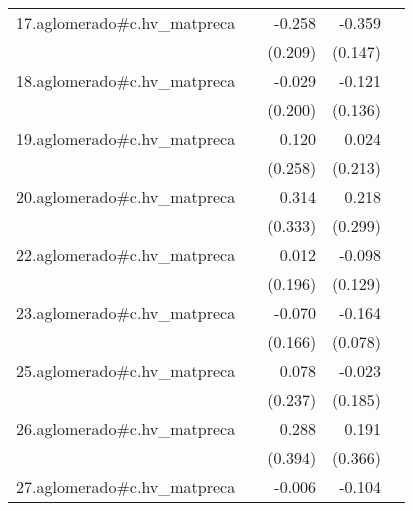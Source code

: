 {\begin{longtable}{l*{4}{D{.}{.}{-1}}}
\addlinespace
17.aglomerado#c.hv\_matpreca&                     &      -0.258         &      -0.359\sym{*}  &                     \\
            &                     &     (0.209)         &     (0.147)         &                     \\
\addlinespace
18.aglomerado#c.hv\_matpreca&                     &      -0.029         &      -0.121         &                     \\
            &                     &     (0.200)         &     (0.136)         &                     \\
\addlinespace
19.aglomerado#c.hv\_matpreca&                     &       0.120         &       0.024         &                     \\
            &                     &     (0.258)         &     (0.213)         &                     \\
\addlinespace
20.aglomerado#c.hv\_matpreca&                     &       0.314         &       0.218         &                     \\
            &                     &     (0.333)         &     (0.299)         &                     \\
\addlinespace
22.aglomerado#c.hv\_matpreca&                     &       0.012         &      -0.098         &                     \\
            &                     &     (0.196)         &     (0.129)         &                     \\
\addlinespace
23.aglomerado#c.hv\_matpreca&                     &      -0.070         &      -0.164\sym{*}  &                     \\
            &                     &     (0.166)         &     (0.078)         &                     \\
\addlinespace
25.aglomerado#c.hv\_matpreca&                     &       0.078         &      -0.023         &                     \\
            &                     &     (0.237)         &     (0.185)         &                     \\
\addlinespace
26.aglomerado#c.hv\_matpreca&                     &       0.288         &       0.191         &                     \\
            &                     &     (0.394)         &     (0.366)         &                     \\
\addlinespace
27.aglomerado#c.hv\_matpreca&                     &      -0.006         &      -0.104\sym{*}  &                     \\

\end{longtable}}
